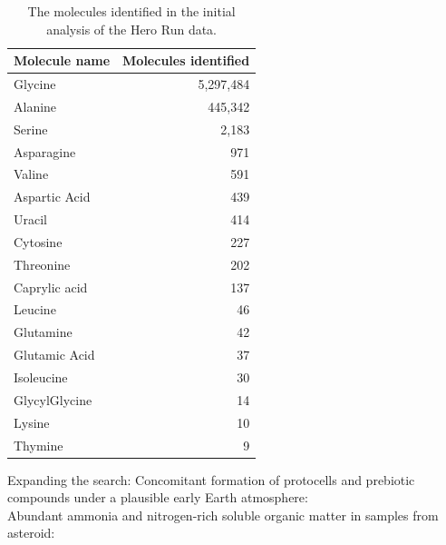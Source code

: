 \begin{table}[hb]
    \centering
    \begin{tabularx}{3in}{Xr}
        \hline
        Molecule name & Molecules identified \\
        \hline
        Glycine & 5,297,484 \\
        Alanine & 445,342 \\
        Serine & 2,183 \\
        Asparagine & 971 \\
        Valine & 591 \\
        Aspartic Acid & 439 \\
        Uracil & 414 \\
        Cytosine & 227 \\
        Threonine & 202 \\
        Caprylic acid & 137 \\
        Leucine & 46 \\
        Glutamine & 42 \\
        Glutamic Acid & 37 \\
        Isoleucine & 30 \\
        GlycylGlycine & 14 \\
        Lysine & 10 \\
        Thymine & 9 \\
        \hline
    \end{tabularx}
    \caption[Initial Early Earth molfind search]{The molecules identified in the initial analysis of the Hero Run data.}
    \label{tab:inital_molfind_counts}
\end{table}




Expanding the search:
Concomitant formation of protocells and prebiotic compounds under a plausible early Earth atmosphere: \cite{prebiotic_compounds_EE_atmosphere}\\
Abundant ammonia and nitrogen-rich soluble organic matter in samples from asteroid: \cite{astroid_sample}\\


